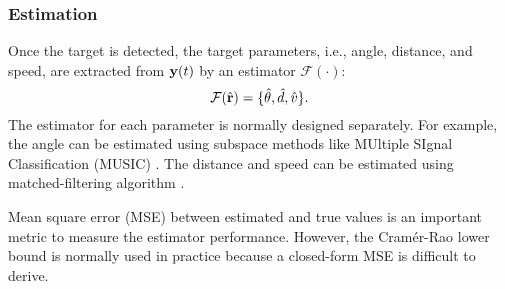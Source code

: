\subsubsection{Estimation}
Once the target is detected, the target parameters, i.e., angle, distance, and speed, are extracted from ${\bf y}(t)$ by an 
estimator $\mathcal{F}(\cdot)$:
\begin{equation}
    \mathcal{F}(\hat{\bf r}) = \{ \hat{\theta}, \hat{d}, \hat{v} \}.
\end{equation}
The estimator for each parameter is normally designed separately. For example, the angle can be estimated using subspace methods like
MUltiple SIgnal Classification (MUSIC) \cite{schmidt1986multiple}. The distance and speed can be estimated using matched-filtering 
algorithm \cite{liu2020road}.

Mean square error (MSE) between estimated and true values is an important metric to measure the estimator performance.
However, the Cramér-Rao lower bound is normally used in practice because a closed-form MSE is difficult to derive.
